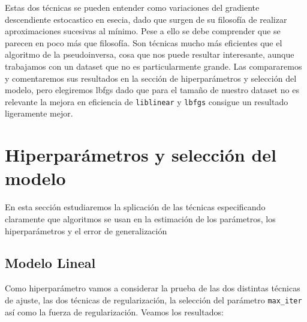 \documentclass[11pt,a4paper]{article}
\begin{document}
Estas dos técnicas se pueden entender como variaciones del gradiente descendiente estocastico en esecia, dado que surgen de su filosofía de realizar aproximaciones sucesivas al mínimo. Pese a ello se debe comprender que se parecen en poco más que filosofía. Son técnicas mucho más eficientes que el algoritmo de la pseudoinversa, cosa que nos puede resultar interesante, aunque trabajamos con un dataset que no es particularmente grande. Las compararemos y comentaremos sus resultados  en la sección de hiperparámetros y selección del modelo, pero elegiremos lbfgs dado que para el tamaño de nuestro dataset no es relevante la mejora en eficiencia de \texttt{liblinear} y \texttt{lbfgs} consigue un resultado ligeramente mejor.


\section{Hiperparámetros y selección del modelo}
 En esta sección estudiaremos la splicación de las técnicas especificando claramente que algoritmos se usan en la estimación de los parámetros, los hiperparámetros y el error de generalización
 
\subsection{Modelo Lineal}

Como hiperparámetro vamos a considerar la prueba de las dos distintas técnicas de ajuste, las dos técnicas de regularización, la selección del parámetro \texttt{max\_iter} así como la fuerza de regularización. Veamos los resultados:
\end{document}
